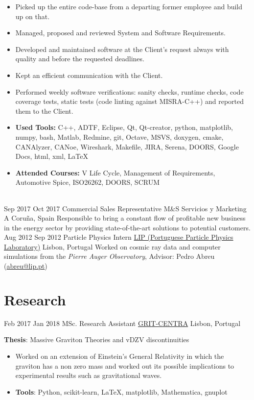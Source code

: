 \documentclass[letterpaper]{twentysecondcv} %
\begin{document}
\begin{twenty}
{\begin{itemize}
        \item Picked up the entire code-base from a departing former employee and build up on that.
        \item Managed, proposed and reviewed System and Software Requirements.
        \item Developed and maintained software at the Client's request always with quality and before the requested deadlines.
        \item Kept an efficient communication with the Client.
        \item Performed weekly software verifications: sanity checks, runtime checks, code coverage tests, static tests (code linting against MISRA-C++) and reported them to the Client.
        \item \textbf{Used Tools:} C++, ADTF, Eclipse, Qt, Qt-creator, python, matplotlib, numpy, bash, Matlab, Redmine, git, Octave, MSVS, doxygen, cmake, CANAlyzer, CANoe, Wireshark, Makefile, JIRA, Serena, DOORS, Google Docs, html, xml, \LaTeX
        \item \textbf{Attended Courses:} V Life Cycle, Management of Requirements, Automotive Spice, ISO26262, DOORS, SCRUM 
        \end{itemize}}
        \\
    \twentyitem
        {Sep 2017}
        {Oct 2017}
        {Commercial Sales Representative}
        {M\&S Servicios y Marketing}
        {A Coruña, Spain}
        {Responsible to bring a constant flow of profitable new business in the energy sector by providing state-of-the-art solutions to potential customers.}
    \\   
    \twentyitem
        {Aug 2012}
        {Sep 2012}
        {Particle Physics Intern}
        {\href{https://www.lip.pt}{LIP (Portuguese Particle Physics Laboratory)}}
        {Lisbon, Portugal}
        {Worked on cosmic ray data and computer simulations from the \emph{Pierre Auger Observatory}, Advisor: Pedro Abreu (\href{mailto:abreu@lip.pt}{abreu@lip.pt})
        }
\end{twenty}

\section{Research}
\begin{twenty}
    \twentyitem
        {Feb 2017}
        {Jan 2018}
        {MSc.  Research Assistant}
        {\href{https://centra.tecnico.ulisboa.pt/network/grit/team/}{GRIT-CENTRA}}
        {Lisbon, Portugal}
        {
        \textbf{Thesis}: Massive Graviton Theories and vDZV discontinuities
        {\begin{itemize}
        \item Worked on an extension of Einstein's General Relativity in which the graviton has a non zero mass and worked out its possible implications to experimental results such as gravitational waves.
        \item \textbf{Tools}: Python, scikit-learn, \LaTeX, matplotlib, Mathematica, gnuplot
        \end{itemize}}
        }
\end{twenty}
\end{document}

